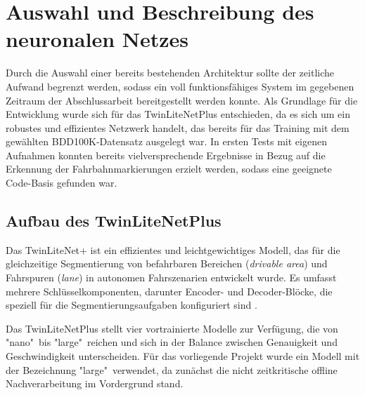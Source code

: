 \section{Auswahl und Beschreibung des neuronalen Netzes}
    Durch die Auswahl einer bereits bestehenden Architektur sollte der zeitliche Aufwand begrenzt werden, sodass ein voll funktionsfähiges System im gegebenen Zeitraum der Abschlussarbeit bereitgestellt werden konnte.
    Als Grundlage für die Entwicklung wurde sich für das TwinLiteNetPlus \cite{TwinLiteNet} entschieden, da es sich um ein robustes und effizientes Netzwerk handelt, das bereits für das Training mit dem gewählten BDD100K-Datensatz ausgelegt war.
    In ersten Tests mit eigenen Aufnahmen konnten bereits vielversprechende Ergebnisse in Bezug auf die Erkennung der Fahrbahnmarkierungen erzielt werden, sodass eine geeignete Code-Basis gefunden war. %

    \subsection{Aufbau des TwinLiteNetPlus}
    \label{TwinLiteNetPlus}
        Das TwinLiteNet+ ist ein effizientes und leichtgewichtiges Modell, das für die gleichzeitige Segmentierung von befahrbaren Bereichen (\textit{drivable area}) und Fahrspuren (\textit{lane}) in autonomen Fahrszenarien entwickelt wurde. Es umfasst mehrere Schlüsselkomponenten, darunter Encoder- und Decoder-Blöcke, die speziell für die Segmentierungsaufgaben konfiguriert sind \cite{TwinLiteNet}. 

        Das TwinLiteNetPlus stellt vier vortrainierte Modelle zur Verfügung, die von "nano"\ bis "large"\ reichen und sich in der Balance zwischen Genauigkeit und Geschwindigkeit unterscheiden. %
        Für das vorliegende Projekt wurde ein Modell mit der Bezeichnung "large"\ verwendet, da zunächst die nicht zeitkritische offline Nachverarbeitung im Vordergrund stand.


